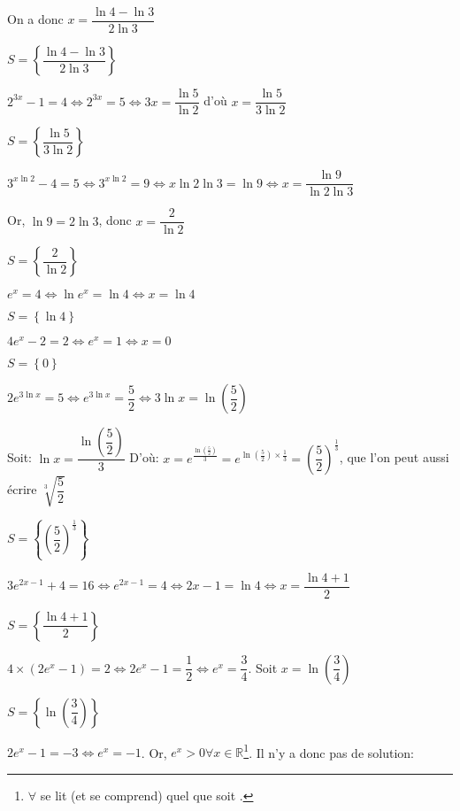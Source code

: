 \documentclass[a4paper,12pt]{scrartcl}
\begin{document}
On a donc $x = \dfrac{\ln 4 - \ln 3}{2 \ln 3}$

$S = \left\lbrace \dfrac{\ln 4 - \ln 3}{2 \ln 3} \right\rbrace$

\question{}
$2^{3x} - 1 = 4 \Leftrightarrow 2^{3x} = 5 \Leftrightarrow 3x = \dfrac{\ln 5}{\ln 2}$ d'où $x = \dfrac{\ln 5}{3 \ln 2}$

$S = \left\lbrace \dfrac{\ln 5}{3 \ln 2} \right\rbrace$

\question{}
$3^{x \ln 2} - 4 = 5 \Leftrightarrow 3^{x \ln 2} = 9 \Leftrightarrow x \ln 2 \ln 3 = \ln 9 \Leftrightarrow x = \dfrac{\ln 9}{\ln 2 \ln 3}$

Or, $\ln 9 = 2 \ln 3$, donc $x = \dfrac{2}{\ln 2}$

$S = \left\lbrace \dfrac{2}{\ln 2} \right\rbrace$

\question{}
$e^x = 4 \Leftrightarrow \ln e^x = \ln 4 \Leftrightarrow x = \ln 4$

$S = \left\lbrace \ln 4 \right\rbrace$

\question{}
$4 e^x - 2 = 2 \Leftrightarrow e^x = 1 \Leftrightarrow x = 0$

$S = \left\lbrace 0 \right\rbrace$

\question{}
$2 e^{3 \ln x} = 5 \Leftrightarrow e^{3 \ln x} = \dfrac{5}{2} \Leftrightarrow 3 \ln x = \ln \left( \dfrac{5}{2} \right)$

Soit: $\ln x = \dfrac{ \ln \left( \dfrac{5}{2} \right)}{3}$
D'où: $x = e^{\frac{ \ln \left( \frac{5}{2} \right)}{3}} = e^{\ln \left( \frac{5}{2} \right) \times \frac{1}{3}} = \left( \dfrac{5}{2} \right)^\frac{1}{3}$, que l'on peut aussi écrire $\sqrt[3]{\dfrac{5}{2}}$

$S = \left\lbrace \left( \dfrac{5}{2} \right)^\frac{1}{3} \right\rbrace$

\question{}
$3 e^{2x-1} + 4 = 16 \Leftrightarrow e^{2x-1} = 4 \Leftrightarrow 2x-1 = \ln 4 \Leftrightarrow x = \dfrac{\ln 4 + 1}{2}$

$S = \left\lbrace \dfrac{\ln 4 + 1}{2} \right\rbrace$

\question{}
$4 \times (2e^x - 1) = 2 \Leftrightarrow 2e^x - 1 = \dfrac{1}{2} \Leftrightarrow e^x = \dfrac{3}{4}$. Soit $x = \ln \left( \dfrac{3}{4} \right)$

$S = \left\lbrace \ln \left( \dfrac{3}{4} \right) \right\rbrace$

\question{}
$2e^x - 1 = -3 \Leftrightarrow e^x = -1$. Or, $e^x > 0 \forall x \in \mathbb{R}$\footnote{$\forall$ se lit (et se comprend) \og quel que soit \fg{}.}. Il n'y a donc pas de solution:
\end{document}
